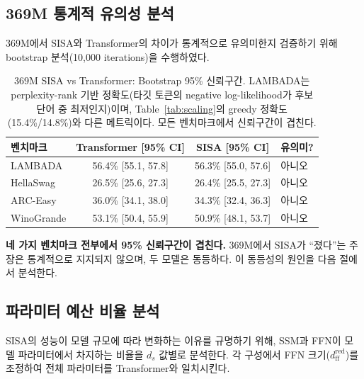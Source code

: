 \documentclass[11pt]{article}
\begin{document}
\subsection{369M 통계적 유의성 분석}
\label{sec:bootstrap}

369M에서 SISA와 Transformer의 차이가 통계적으로 유의미한지 검증하기 위해 bootstrap 분석(10,000 iterations)을 수행하였다.

\begin{table}[h]
\centering
\caption{369M SISA vs Transformer: Bootstrap 95\% 신뢰구간. LAMBADA는 perplexity-rank 기반 정확도(타깃 토큰의 negative log-likelihood가 후보 단어 중 최저인지)이며, Table~\ref{tab:scaling}의 greedy 정확도(15.4\%/14.8\%)와 다른 메트릭이다. 모든 벤치마크에서 신뢰구간이 겹친다.}
\label{tab:bootstrap}
\begin{tabular}{lccl}
\toprule
\textbf{벤치마크} & \textbf{Transformer [95\% CI]} & \textbf{SISA [95\% CI]} & \textbf{유의미?} \\
\midrule
LAMBADA & 56.4\% [55.1, 57.8] & 56.3\% [55.0, 57.6] & 아니오 \\
HellaSwag & 26.5\% [25.6, 27.3] & 26.4\% [25.5, 27.3] & 아니오 \\
ARC-Easy & 36.0\% [34.1, 38.0] & 34.3\% [32.4, 36.3] & 아니오 \\
WinoGrande & 53.1\% [50.4, 55.9] & 50.9\% [48.1, 53.7] & 아니오 \\
\bottomrule
\end{tabular}
\end{table}

\textbf{네 가지 벤치마크 전부에서 95\% 신뢰구간이 겹친다.} 369M에서 SISA가 ``졌다''는 주장은 통계적으로 지지되지 않으며, 두 모델은 동등하다. 이 동등성의 원인을 다음 절에서 분석한다.

\subsection{파라미터 예산 비율 분석}
\label{sec:ffn_ratio}

SISA의 성능이 모델 규모에 따라 변화하는 이유를 규명하기 위해, SSM과 FFN이 모델 파라미터에서 차지하는 비율을 $d_s$ 값별로 분석한다. 각 구성에서 FFN 크기($d_{\text{ff}}^{\text{red}}$)를 조정하여 전체 파라미터를 Transformer와 일치시킨다.
\end{document}
